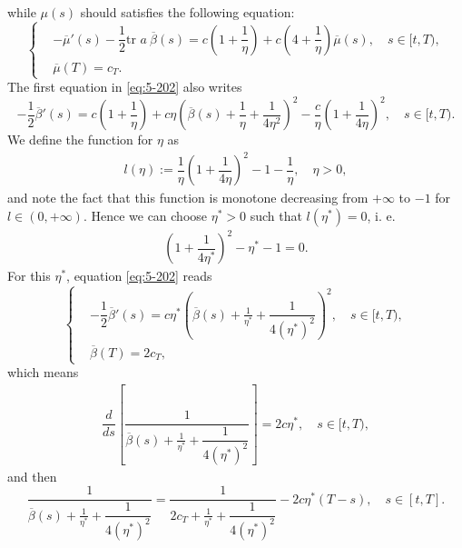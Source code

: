 \documentclass[11pt]{article}
\numberwithin{equation}{section}
\newcommand{\1}{\mbox{1\hspace{-1mm}I}}
\begin{document}
while $\mu(s)$ should satisfies the following equation:
\begin{equation}\label{eq:5-203}
    \left\{
    \begin{aligned}
        &-\overline{\mu}'(s)-\dfrac{1}{2}\text{tr }a\:\overline{\beta}(s)=c\left(1+\dfrac{1}{\eta}\right)+c\left(4+\dfrac{1}{\eta}\right)\overline{\mu}(s),\quad s\in[t,T),\\
        &\overline{\mu}(T)=c_T.
    \end{aligned}
    \right.
\end{equation}
The first equation in \eqref{eq:5-202} also writes
\begin{equation*}\label{eq:5-204}
    -\dfrac{1}{2}\overline{\beta}'(s)=c\left(1+\dfrac{1}{\eta}\right)+c\eta\left(\overline{\beta}(s)+\frac{1}{\eta}+\dfrac{1}{4\eta^2}\right)^{2}-\dfrac{c}{\eta}\left(1+\dfrac{1}{4\eta}\right)^{2},\quad s\in[t,T).
\end{equation*}
We define the function for $\eta$ as
\begin{align*}
    l(\eta):=\dfrac{1}{\eta}\left(1+\dfrac{1}{4\eta}\right)^{2}-1-\dfrac{1}{\eta},\quad \eta>0,
\end{align*}
and note the fact that this function is monotone decreasing from $+\infty$ to $-1$ for $l\in(0,+\infty)$. Hence we can choose $\eta^*>0$ such that $l\left(\eta^*\right)=0$, i. e. 
\begin{align*}
    \left(1+\dfrac{1}{4\eta^*}\right)^{2}-\eta^*-1=0.
\end{align*}
For this $\eta^*$, equation \eqref{eq:5-202} reads 
\begin{equation*}
    \left\{
    \begin{aligned}
        &-\dfrac{1}{2}\overline{\beta}'(s)=c\eta^*\left(\overline{\beta}(s)+\frac{1}{\eta^*}+\dfrac{1}{4\left(\eta^*\right)^2}\right)^{2},\quad s\in[t,T),\\
        &\overline{\beta}(T)=2c_T,
    \end{aligned}
    \right.
\end{equation*}
which means 
\begin{align*}
    \dfrac{d}{ds}\left[\dfrac{1}{\overline{\beta}(s)+\frac{1}{\eta^*}+\dfrac{1}{4\left(\eta^*\right)^2}}\right]=2c\eta^*,\quad s\in[t,T),
\end{align*}
and then 
\begin{equation}\label{eq:5-205}
    \dfrac{1}{\overline{\beta}(s)+\frac{1}{\eta^*}+\dfrac{1}{4\left(\eta^*\right)^2}}=\dfrac{1}{2c_T+\frac{1}{\eta^*}+\dfrac{1}{4\left(\eta^*\right)^2}}-2c\eta^*(T-s),\quad s\in[t,T]. 
\end{equation}
\end{document}
